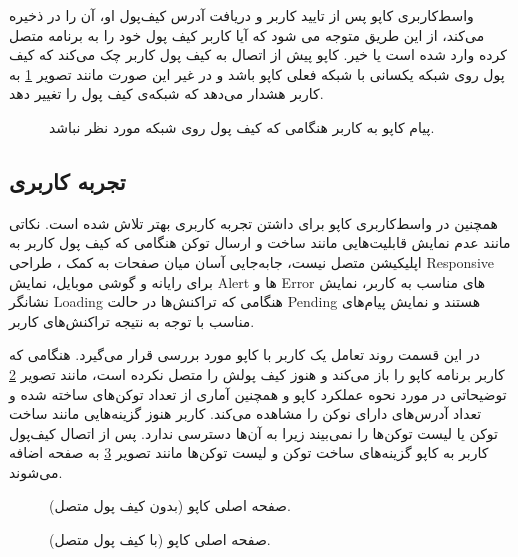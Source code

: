 واسط‌کاربری کاپو پس از تایید کاربر و دریافت آدرس کیف‌پول او، آن را در
ذخیره می‌کند،
از این طریق متوجه می شود که آیا کاربر کیف پول خود را به برنامه متصل کرده وارد شده است یا خیر.
کاپو پیش از اتصال به کیف پول کاربر چک می‌کند که کیف پول روی شبکه یکسانی با شبکه فعلی کاپو باشد
و در غیر این صورت مانند تصویر
\ref{fig:cappu-wrong-network-error}
به کاربر هشدار می‌دهد که شبکه‌ی کیف پول را تغییر دهد.

\begin{figure}[H]
\centerline{}
\caption{پیام کاپو به کاربر هنگامی که کیف پول روی شبکه مورد نظر نباشد.}
\label{fig:cappu-wrong-network-error}
\end{figure}

\subsection{تجربه کاربری}
همچنین در واسط‌کاربری کاپو برای داشتن تجربه کاربری بهتر تلاش شده است.
نکاتی مانند عدم نمایش قابلیت‌هایی مانند ساخت و ارسال توکن هنگامی که کیف پول کاربر به اپلیکیشن متصل نیست،
جابه‌جایی آسان میان صفحات به کمک
، طراحی
\gls{Responsive}
برای رایانه و گوشی موبایل، نمایش
\gls{Alert}
ها و
\gls{Error}
های مناسب به کاربر، نمایش نشانگر
\gls{Loading}
هنگامی که تراکنش‌ها در حالت
\gls{Pending}
هستند و نمایش پیام‌های مناسب با توجه به نتیجه تراکنش‌های کاربر.

در این قسمت روند تعامل یک کاربر با کاپو مورد بررسی قرار می‌گیرد.
هنگامی که کاربر برنامه کاپو را باز می‌کند و هنوز کیف پولش را متصل نکرده است،
مانند تصویر
\ref{fig:homepage-not-loggedin}
توضیحاتی در مورد نحوه عملکرد کاپو
و همچنین آماری از تعداد توکن‌های ساخته شده و تعداد آدرس‌های دارای نوکن را مشاهده می‌کند.
کاربر هنوز گزینه‌هایی مانند ساخت توکن یا لیست توکن‌ها را نمی‌بیند زیرا به آن‌ها دسترسی ندارد.
پس از اتصال کیف‌پول کاربر  به کاپو گزینه‌های ساخت توکن و لیست توکن‌ها مانند تصویر
\ref{fig:homepage-loggedin}
به صفحه اضافه می‌شوند.

\begin{figure}
\centerline{}
\caption{صفحه اصلی کاپو (بدون کیف پول متصل).}
\label{fig:homepage-not-loggedin}
\end{figure}

\begin{figure}
\centerline{}
\caption{صفحه اصلی کاپو (با کیف پول متصل).}
\label{fig:homepage-loggedin}
\end{figure}

